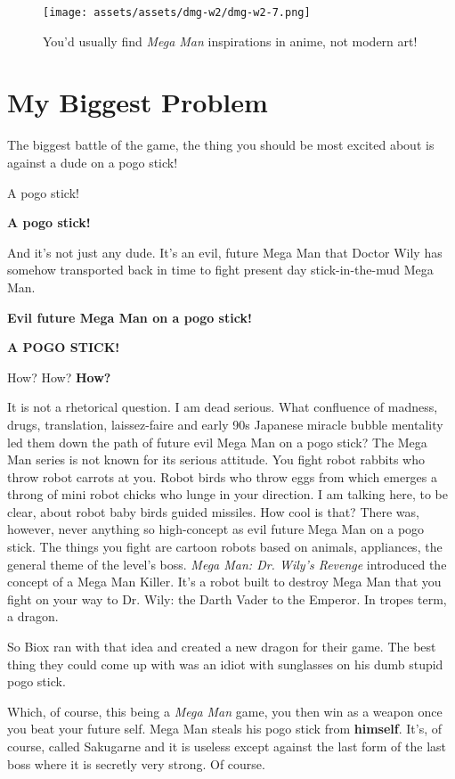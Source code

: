 \documentclass{book}
\begin{document}
\begin{figure}[hbt]
\vskip 10pt
\centering \texttt{[image: assets/assets/dmg-w2/dmg-w2-7.png]}\par\pagetwodescription You’d usually find \emph{Mega Man} inspirations in anime, not modern art!
\vskip 6pt
\end{figure}

\FloatBarrier\needspace{5pt}\section*{My Biggest Problem}\nopagebreak[4]

The biggest battle of the game, the thing you should be most excited about is against a dude on a pogo stick!

A pogo stick!

\textbf{A pogo stick!}

And it’s not just any dude. It’s an evil, future Mega Man that Doctor Wily has somehow transported back in time to fight present day stick-in-the-mud Mega Man.

\textbf{Evil future Mega Man on a pogo stick!}

\textbf{A POGO STICK!}

How? How? \textbf{How?}

It is not a rhetorical question. I am dead serious. What confluence of madness, drugs, translation, laissez-faire and early 90s Japanese miracle bubble mentality led them down the path of future evil Mega Man on a pogo stick? The Mega Man series is not known for its serious attitude. You fight robot rabbits who throw robot carrots at you. Robot birds who throw eggs from which emerges a throng of mini robot chicks who lunge in your direction. I am talking here, to be clear, about robot baby birds guided missiles. How cool is that? There was, however, never anything so high-concept as evil future Mega Man on a pogo stick. The things you fight are cartoon robots based on animals, appliances, the general theme of the level’s boss. \emph{Mega Man: Dr. Wily’s Revenge} introduced the concept of a Mega Man Killer. It’s a robot built to destroy Mega Man that you fight on your way to Dr. Wily: the Darth Vader to the Emperor. In tropes term, a dragon.

So Biox ran with that idea and created a new dragon for their game. The best thing they could come up with was an idiot with sunglasses on his dumb stupid pogo stick.

Which, of course, this being a \emph{Mega Man} game, you then win as a weapon once you beat your future self. Mega Man steals his pogo stick from \textbf{himself}. It’s, of course, called Sakugarne and it is useless except against the last form of the last boss where it is secretly very strong. Of course.
\end{document}
